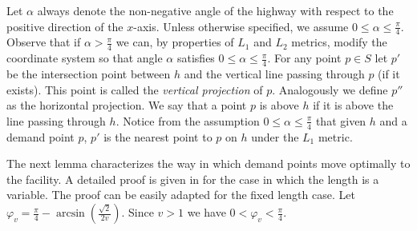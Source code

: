 \documentclass{llncs}
\begin{document}
Let $\alpha$ always denote the non-negative angle of the highway
with respect to the positive direction of the $x$-axis. Unless
otherwise specified, we assume $0\leq\alpha\leq\frac{\pi}{4}$.
Observe that if $\alpha>\frac{\pi}{4}$ we can, by properties of
$L_1$ and $L_2$ metrics, modify the coordinate system so that angle
$\alpha$ satisfies $0\leq\alpha\leq\frac{\pi}{4}$.
For any point $p\in S$ let $p'$ be the intersection point between $h$ and the vertical line passing through $p$ (if it exists). This point is called the {\em vertical projection} of $p$. Analogously we define $p''$ as the horizontal projection. We say that a point $p$ is above $h$ if it is above the line passing through $h$. Notice from the
assumption $0\leq\alpha\leq\frac{\pi}{4}$ that given $h$ and a
demand point $p$, $p'$ is the nearest point to $p$ on $h$ under the
$L_1$ metric.

The next lemma characterizes the way in which demand points move
optimally to the facility. A detailed proof is given in \cite{bklv-lsfrtlovl-11} for the case in which the length is a variable. The proof can be easily adapted for the fixed length case.
Let $\varphi_v=\frac{\pi}{4}-\arcsin\left(\frac{\sqrt{2}}{2v}\right)$. Since $v>1$
we have $0<\varphi_v<\frac{\pi}{4}$.
\end{document}
